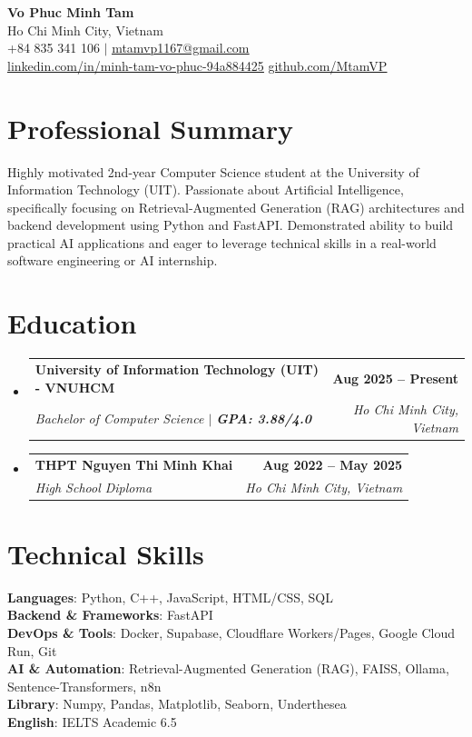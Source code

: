 \documentclass[letterpaper,11pt]{article}
\makeatletter
\newcommand{\resumeEduHeading}[4]{
  \vspace{-2pt}\item
    \begin{tabular*}{1.0\textwidth}[t]{l@{\extracolsep{\fill}}r}
      \textbf{#1} & \textbf{#2} \\
      \textit{\small#3} & \textit{\small #4} \\
    \end{tabular*}\vspace{-7pt}
}
\newcommand{\resumeSubHeadingListStart}{\begin{itemize}[leftmargin=0.0in, label={}]}
\newcommand{\resumeSubHeadingListEnd}{\end{itemize}}
\makeatother
\begin{document}
\begin{center}
    \textbf{\Huge Vo Phuc Minh Tam} \\ \vspace{4pt}
    \small Ho Chi Minh City, Vietnam \\ \vspace{2pt}
    \small +84 835 341 106 $|$ \href{mailto:mtamvp1167@gmail.com}{\underline{mtamvp1167@gmail.com}} \\
    \href{https://www.linkedin.com/in/minh-tam-vo-phuc-94a884425}{\underline{linkedin.com/in/minh-tam-vo-phuc-94a884425}} \quad
    \href{https://github.com/MtamVP}{\underline{github.com/MtamVP}}
\end{center}

\section{Professional Summary}
 \small{Highly motivated 2nd-year Computer Science student at the University of Information Technology (UIT). Passionate about Artificial Intelligence, specifically focusing on Retrieval-Augmented Generation (RAG) architectures and backend development using Python and FastAPI. Demonstrated ability to build practical AI applications and eager to leverage technical skills in a real-world software engineering or AI internship.} \vspace{4pt}
 
\section{Education}
  \resumeSubHeadingListStart
    \resumeEduHeading
      {University of Information Technology (UIT) - VNUHCM}{Aug 2025 -- Present}
      {Bachelor of Computer Science $|$ \textbf{GPA: 3.88/4.0}}{Ho Chi Minh City, Vietnam}
    \resumeEduHeading
      {THPT Nguyen Thi Minh Khai}{Aug 2022 -- May 2025}
      {High School Diploma}{Ho Chi Minh City, Vietnam}
  \resumeSubHeadingListEnd

\section{Technical Skills}
 \begin{itemize}[leftmargin=0.15in, label={}]
    \small{\item{
     \textbf{Languages}{: Python, C++, JavaScript, HTML/CSS, SQL} \\
     \textbf{Backend \& Frameworks}{: FastAPI} \\
     \textbf{DevOps \& Tools}{: Docker, Supabase, Cloudflare Workers/Pages, Google Cloud Run, Git} \\
     \textbf{AI \& Automation}{: Retrieval-Augmented Generation (RAG), FAISS, Ollama, Sentence-Transformers, n8n} \\
     \textbf{Library}{: Numpy, Pandas, Matplotlib, Seaborn, Underthesea}\\
     \textbf{English}{: IELTS Academic 6.5}
    }}
 \end{itemize}
\end{document}
